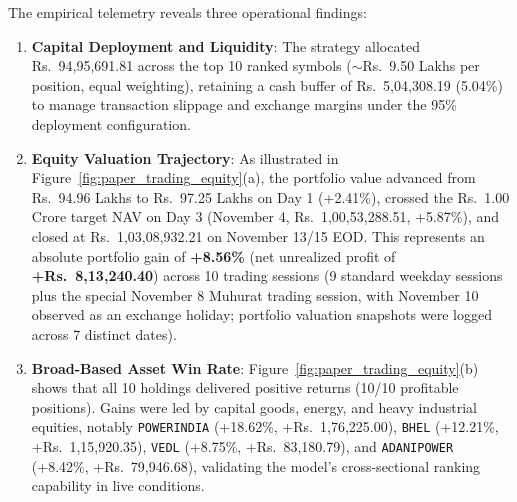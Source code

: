 The empirical telemetry reveals three operational findings:
\begin{enumerate}
    \item \textbf{Capital Deployment and Liquidity}: The strategy allocated \textsf{Rs.~}94,95,691.81 across the top 10 ranked symbols ($\sim$\textsf{Rs.~}9.50 Lakhs per position, equal weighting), retaining a cash buffer of \textsf{Rs.~}5,04,308.19 (5.04\%) to manage transaction slippage and exchange margins under the 95\% deployment configuration.
    \item \textbf{Equity Valuation Trajectory}: As illustrated in Figure~\ref{fig:paper_trading_equity}(a), the portfolio value advanced from \textsf{Rs.~}94.96 Lakhs to \textsf{Rs.~}97.25 Lakhs on Day 1 (+2.41\%), crossed the \textsf{Rs.~}1.00 Crore target NAV on Day 3 (November 4, \textsf{Rs.~}1,00,53,288.51, +5.87\%), and closed at \textsf{Rs.~}1,03,08,932.21 on November 13/15 EOD. This represents an absolute portfolio gain of \textbf{+8.56\%} (net unrealized profit of \textbf{+\textsf{Rs.~}8,13,240.40}) across 10 trading sessions (9 standard weekday sessions plus the special November 8 Muhurat trading session, with November 10 observed as an exchange holiday; portfolio valuation snapshots were logged across 7 distinct dates).
    \item \textbf{Broad-Based Asset Win Rate}: Figure~\ref{fig:paper_trading_equity}(b) shows that all 10 holdings delivered positive returns (10/10 profitable positions). Gains were led by capital goods, energy, and heavy industrial equities, notably \texttt{POWERINDIA} (+18.62\%, +\textsf{Rs.~}1,76,225.00), \texttt{BHEL} (+12.21\%, +\textsf{Rs.~}1,15,920.35), \texttt{VEDL} (+8.75\%, +\textsf{Rs.~}83,180.79), and \texttt{ADANIPOWER} (+8.42\%, +\textsf{Rs.~}79,946.68), validating the model's cross-sectional ranking capability in live conditions.
\end{enumerate}

